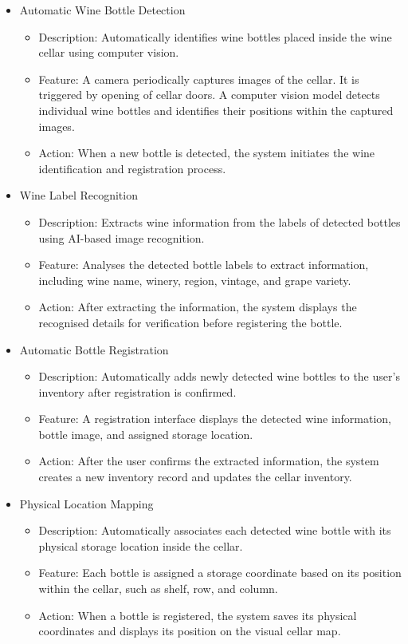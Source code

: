 \documentclass[conference]{IEEEtran}
\begin{document}
\begin{itemize}
    \item Automatic Wine Bottle Detection
    \begin{itemize}
        \item Description: Automatically identifies wine bottles placed inside the wine cellar using computer vision.
        \item Feature: A camera periodically captures images of the cellar. It is triggered by opening of cellar doors. A computer vision model detects individual wine bottles and identifies their positions within the captured images.
        \item Action: When a new bottle is detected, the system initiates the wine identification and registration process.
    \end{itemize}

    \item Wine Label Recognition
    \begin{itemize}
        \item Description: Extracts wine information from the labels of detected bottles using AI-based image recognition.
        \item Feature: Analyses the detected bottle labels to extract information, including wine name, winery, region, vintage, and grape variety.
        \item Action: After extracting the information, the system displays the recognised details for verification before registering the bottle.
    \end{itemize}

    \item Automatic Bottle Registration
    \begin{itemize}
        \item Description: Automatically adds newly detected wine bottles to the user's inventory after registration is confirmed.
        \item Feature: A registration interface displays the detected wine information, bottle image, and assigned storage location.
        \item Action: After the user confirms the extracted information, the system creates a new inventory record and updates the cellar inventory.
    \end{itemize}

    \item Physical Location Mapping
    \begin{itemize}
        \item Description: Automatically associates each detected wine bottle with its physical storage location inside the cellar.
        \item Feature: Each bottle is assigned a storage coordinate based on its position within the cellar, such as shelf, row, and column.
        \item Action: When a bottle is registered, the system saves its physical coordinates and displays its position on the visual cellar map.
    \end{itemize}


\end{itemize}
\end{document}
